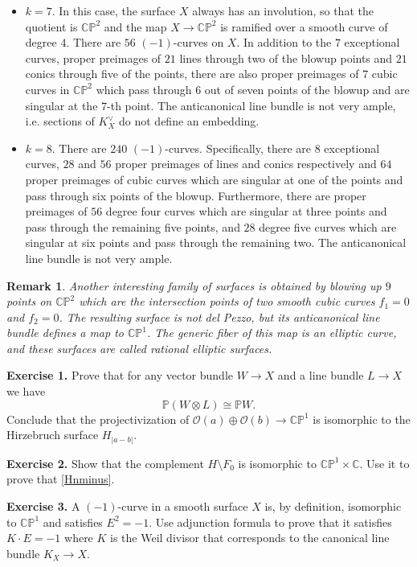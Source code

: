 \documentclass[11pt]{article}
\numberwithin{equation}{section}
\numberwithin{footnote}{section}
\newtheorem{rem}[thm]{Remark}
\newcommand{\blue}{\color{blue}}
\renewcommand{\P}{{\mathbb P}}
\newcommand{\C}{{\mathbb C}}
\begin{document}
\begin{itemize}
\item $k=7.$ In this case, the surface $X$ always has an involution, so that the quotient is $\C\P^2$ and the map
$X\to \C\P^2$ is ramified over a smooth curve of degree $4$. There are $56$ $(-1)$-curves on $X$. 
In addition to the $7$ exceptional curves, proper preimages of $21$ lines through two of the blowup points and 
$21$ conics through five of the points, there are also proper preimages of $7$ cubic curves in $\C\P^2$ which pass through $6$ out of seven points of the blowup and are singular at the $7$-th point.
The anticanonical line bundle is not very ample, i.e. sections of $K_X^\vee$ do not define an embedding.

\item $k=8.$ There are $240$ $(-1)$-curves. Specifically, there are $8$ exceptional curves, $28$ and $56$ proper preimages of lines and conics respectively and $64$ proper preimages of cubic curves which are singular at one of the points and pass through six points 
of the blowup. Furthermore, there are proper preimages of $56$ degree four curves which are singular at three points and pass through the remaining five points, and $28$ degree five curves which are singular at six points and pass through the remaining two. The anticanonical line bundle is not very ample.

\end{itemize}

\smallskip
\begin{rem}
Another interesting family of surfaces is obtained by blowing up $9$ points on $\C\P^2$ which are the intersection
points of two smooth cubic curves $f_1=0$ and $f_2=0$. The resulting surface is not del Pezzo, but its anticanonical line bundle defines  a map to $\C\P^1$. The generic fiber of this map is an elliptic curve, and these surfaces are called {\blue rational elliptic surfaces}.
\end{rem}

{\bf Exercise 1.} Prove that for any vector bundle $W\to X$ and a line bundle $L\to X$ we have 
$$
\P(W\otimes L) \cong \P W.
$$
Conclude that the projectivization of $\mathcal O(a)\oplus\mathcal O(b)\to \C\P^1$
is isomorphic to the Hirzebruch surface $H_{|a-b|}$.


{\bf Exercise 2.} Show that the complement $H\setminus F_0 $ is isomorphic to $\C\P^1 \times \C$. Use it to prove that \eqref{Hnminus}.

{\bf Exercise 3.} A $(-1)$-curve in a smooth surface $X$ is, by definition, isomorphic to $\C\P^1$ and satisfies $E^2=-1$.
Use adjunction formula to prove that it satisfies $K\cdot E= -1$ where $K$ is the Weil divisor that corresponds to the canonical line bundle $K_X\to X$.
\end{document}
